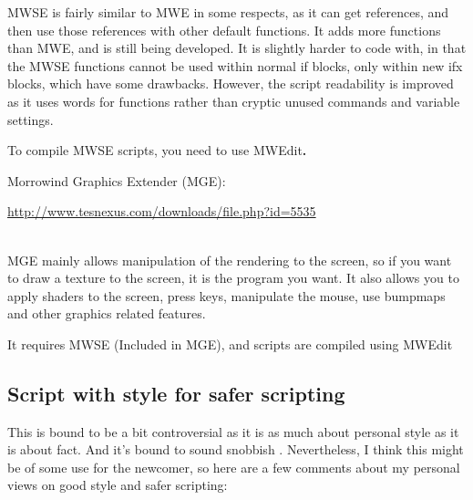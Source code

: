 \documentclass[
]{article}
\begin{document}
MWSE is fairly similar to MWE in some respects, as it can get
references, and then use those references with other default functions.
It adds more functions than MWE, and is still being developed. It is
slightly harder to code with, in that the MWSE functions cannot be used
within normal if blocks, only within new ifx blocks, which have some
drawbacks. However, the script readability is improved as it uses words
for functions rather than cryptic unused commands and variable settings.

To compile MWSE scripts, you need to use MWEdit\textbf{.}

Morrowind Graphics Extender (MGE):

\url{http://www.tesnexus.com/downloads/file.php?id=5535}\strut \\
MGE mainly allows manipulation of the rendering to the screen, so if you
want to draw a texture to the screen, it is the program you want. It
also allows you to apply shaders to the screen, press keys, manipulate
the mouse, use bumpmaps and other graphics related features.

It requires MWSE (Included in MGE), and scripts are compiled using
MWEdit

\hypertarget{script-with-style-for-safer-scripting}{%
\subsection{Script with style for safer
scripting}\label{script-with-style-for-safer-scripting}}

This is bound to be a bit controversial as it is as much about personal
style as it is about fact. And it's bound to sound snobbish .
Nevertheless, I think this might be of some use for the newcomer, so
here are a few comments about my personal views on good style and safer
scripting:
\end{document}
